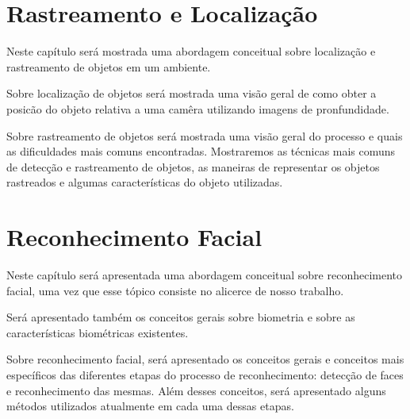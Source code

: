 \chapter{Rastreamento e Localização}

	Neste capítulo será mostrada uma abordagem conceitual sobre localização e rastreamento de objetos em um ambiente.

	Sobre localização de objetos será mostrada uma visão geral de como obter a posicão do objeto relativa a uma camêra utilizando imagens de pronfundidade.

	Sobre rastreamento de objetos será mostrada uma visão geral do processo e quais as dificuldades mais comuns encontradas. Mostraremos as técnicas mais comuns de detecção e rastreamento de objetos, as maneiras de representar os objetos rastreados e algumas características do objeto utilizadas.

	
	

	

\chapter{Reconhecimento Facial}

	Neste capítulo será apresentada uma abordagem conceitual sobre reconhecimento facial, uma vez que esse tópico consiste no alicerce de nosso trabalho. 

	Será apresentado também os conceitos gerais sobre biometria e sobre as características biométricas existentes.

	Sobre reconhecimento facial, será apresentado os conceitos gerais e conceitos mais específicos das diferentes etapas do processo de reconhecimento: detecção de faces e reconhecimento das mesmas. Além desses conceitos, será apresentado alguns métodos utilizados atualmente em cada uma dessas etapas.


	
	





























